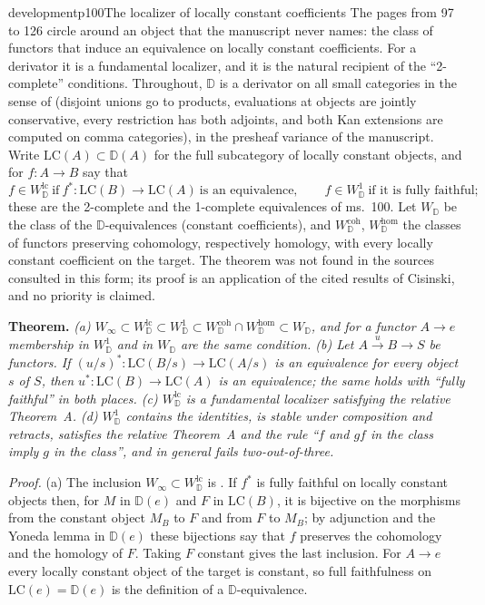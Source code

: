 \begin{dcomment}{development}{p100}{The localizer of locally constant coefficients}
The pages from 97 to 126 circle around an object that the manuscript never names: the class of functors that induce an equivalence on locally constant coefficients. For a derivator it is a fundamental localizer, and it is the natural recipient of the ``2-complete'' conditions. Throughout, $\mathbb D$ is a derivator on all small categories in the sense of \citet[\S3.2]{Cisinski2009LocallyConstant} (disjoint unions go to products, evaluations at objects are jointly conservative, every restriction has both adjoints, and both Kan extensions are computed on comma categories), in the presheaf variance of the manuscript. Write $\mathrm{LC}(A)\subset\mathbb D(A)$ for the full subcategory of locally constant objects, and for $f:A\to B$ say that
\[
 f\in W^{\mathrm{lc}}_{\mathbb D}\ \text{if}\ f^*:\mathrm{LC}(B)\to\mathrm{LC}(A)\ \text{is an equivalence},\qquad
 f\in W^{1}_{\mathbb D}\ \text{if it is fully faithful};
\]
these are the 2-complete and the 1-complete equivalences of ms.~100. Let $W_{\mathbb D}$ be the class of the $\mathbb D$-equivalences (constant coefficients), and $W^{\mathrm{coh}}_{\mathbb D}$, $W^{\mathrm{hom}}_{\mathbb D}$ the classes of functors preserving cohomology, respectively homology, with every locally constant coefficient on the target. The theorem was not found in the sources consulted in this form; its proof is an application of the cited results of Cisinski, and no priority is claimed.

\textbf{Theorem.}\ours
\textit{(a) $W_\infty\subset W^{\mathrm{lc}}_{\mathbb D}\subset W^{1}_{\mathbb D}\subset W^{\mathrm{coh}}_{\mathbb D}\cap W^{\mathrm{hom}}_{\mathbb D}\subset W_{\mathbb D}$, and for a functor $A\to e$ membership in $W^1_{\mathbb D}$ and in $W_{\mathbb D}$ are the same condition.
(b) Let $A\xrightarrow{u}B\to S$ be functors. If $(u/s)^*:\mathrm{LC}(B/s)\to\mathrm{LC}(A/s)$ is an equivalence for every object $s$ of $S$, then $u^*:\mathrm{LC}(B)\to\mathrm{LC}(A)$ is an equivalence; the same holds with ``fully faithful'' in both places.
(c) $W^{\mathrm{lc}}_{\mathbb D}$ is a fundamental localizer satisfying the relative Theorem~A.
(d) $W^1_{\mathbb D}$ contains the identities, is stable under composition and retracts, satisfies the relative Theorem~A and the rule ``$f$ and $gf$ in the class imply $g$ in the class'', and in general fails two-out-of-three.}

\textit{Proof.}
(a) The inclusion $W_\infty\subset W^{\mathrm{lc}}_{\mathbb D}$ is \citet[Corollary~3.8]{Cisinski2009LocallyConstant}. If $f^*$ is fully faithful on locally constant objects then, for $M$ in $\mathbb D(e)$ and $F$ in $\mathrm{LC}(B)$, it is bijective on the morphisms from the constant object $M_B$ to $F$ and from $F$ to $M_B$; by adjunction and the Yoneda lemma in $\mathbb D(e)$ these bijections say that $f$ preserves the cohomology and the homology of $F$. Taking $F$ constant gives the last inclusion. For $A\to e$ every locally constant object of the target is constant, so full faithfulness on $\mathrm{LC}(e)=\mathbb D(e)$ is the definition of a $\mathbb D$-equivalence.


\end{dcomment}
